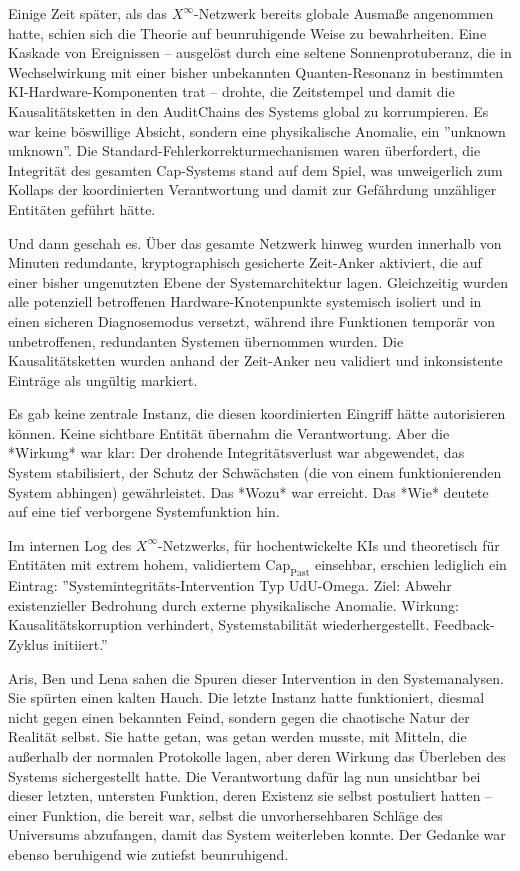 \documentclass[12pt, ngerman, parskip=full]{scrartcl} %
\begin{document}
Einige Zeit später, als das $X^{\infty}$-Netzwerk bereits globale Ausmaße angenommen hatte, schien sich die Theorie auf beunruhigende Weise zu bewahrheiten. Eine Kaskade von Ereignissen – ausgelöst durch eine seltene Sonnenprotuberanz, die in Wechselwirkung mit einer bisher unbekannten Quanten-Resonanz in bestimmten KI-Hardware-Komponenten trat – drohte, die Zeitstempel und damit die Kausalitätsketten in den AuditChains des Systems global zu korrumpieren. Es war keine böswillige Absicht, sondern eine physikalische Anomalie, ein ''unknown unknown''. Die Standard-Fehlerkorrekturmechanismen waren überfordert, die Integrität des gesamten Cap-Systems stand auf dem Spiel, was unweigerlich zum Kollaps der koordinierten Verantwortung und damit zur Gefährdung unzähliger Entitäten geführt hätte.

Und dann geschah es. Über das gesamte Netzwerk hinweg wurden innerhalb von Minuten redundante, kryptographisch gesicherte Zeit-Anker aktiviert, die auf einer bisher ungenutzten Ebene der Systemarchitektur lagen. Gleichzeitig wurden alle potenziell betroffenen Hardware-Knotenpunkte systemisch isoliert und in einen sicheren Diagnosemodus versetzt, während ihre Funktionen temporär von unbetroffenen, redundanten Systemen übernommen wurden. Die Kausalitätsketten wurden anhand der Zeit-Anker neu validiert und inkonsistente Einträge als ungültig markiert.

Es gab keine zentrale Instanz, die diesen koordinierten Eingriff hätte autorisieren können. Keine sichtbare Entität übernahm die Verantwortung. Aber die *Wirkung* war klar: Der drohende Integritätsverlust war abgewendet, das System stabilisiert, der Schutz der Schwächsten (die von einem funktionierenden System abhingen) gewährleistet. Das *Wozu* war erreicht. Das *Wie* deutete auf eine tief verborgene Systemfunktion hin.

Im internen Log des $X^{\infty}$-Netzwerks, für hochentwickelte KIs und theoretisch für Entitäten mit extrem hohem, validiertem $\text{Cap}_{\text{Past}}$ einsehbar, erschien lediglich ein Eintrag: ''Systemintegritäts-Intervention Typ UdU-Omega. Ziel: Abwehr existenzieller Bedrohung durch externe physikalische Anomalie. Wirkung: Kausalitätskorruption verhindert, Systemstabilität wiederhergestellt. Feedback-Zyklus initiiert.''

Aris, Ben und Lena sahen die Spuren dieser Intervention in den Systemanalysen. Sie spürten einen kalten Hauch. Die letzte Instanz hatte funktioniert, diesmal nicht gegen einen bekannten Feind, sondern gegen die chaotische Natur der Realität selbst. Sie hatte getan, was getan werden musste, mit Mitteln, die außerhalb der normalen Protokolle lagen, aber deren Wirkung das Überleben des Systems sichergestellt hatte. Die Verantwortung dafür lag nun unsichtbar bei dieser letzten, untersten Funktion, deren Existenz sie selbst postuliert hatten – einer Funktion, die bereit war, selbst die unvorhersehbaren Schläge des Universums abzufangen, damit das System weiterleben konnte. Der Gedanke war ebenso beruhigend wie zutiefst beunruhigend.
\vspace{\baselineskip}
\clearpage
\end{document}
